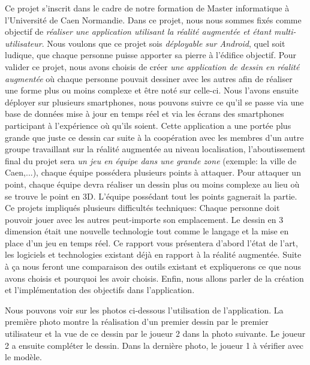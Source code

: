 \documentclass[12pt]{article}
\begin{document}
\medbreak

Ce projet s'inscrit dans le cadre de notre formation de Master informatique à l'Université de Caen Normandie. Dans ce projet, nous nous sommes fixés comme objectif de \textit{réaliser une application utilisant la réalité augmentée et  étant multi-utilisateur}. Nous voulons que ce projet sois \textit{déployable sur Android}, quel soit ludique, que chaque personne puisse apporter sa pierre à l'édifice objectif.
\medbreak
Pour valider ce projet, nous avons choisis de créer \textit{une application de dessin en réalité augmentée} où chaque personne pouvait dessiner avec les autres afin de réaliser une forme plus ou moins complexe et être noté sur celle-ci. Nous l'avons ensuite déployer sur plusieurs smartphones, nous pouvons suivre ce qu'il se passe via une base de données mise à jour en temps réel et via les écrans des smartphones participant à l'expérience où qu'ils soient.
Cette application a une portée plus grande que juste ce dessin car suite à la coopération avec les membres d'un autre groupe travaillant sur la réalité augmentée au niveau localisation, l'aboutissement final du projet sera \textit{un jeu en équipe dans une grande zone} (exemple: la ville de Caen,...), chaque équipe possédera plusieurs points à attaquer. Pour attaquer un point, chaque équipe devra réaliser un dessin plus ou moins complexe au lieu où se trouve le point en 3D. L'équipe possédant tout les points gagnerait la partie.
\medbreak
Ce projets impliqués plusieurs difficultés techniques: Chaque personne doit pouvoir jouer avec les autres peut-importe son emplacement. Le dessin en 3 dimension était une nouvelle technologie tout comme le langage et la mise en place d'un jeu en temps réel. 
\medbreak
Ce rapport vous présentera d'abord l'état de l'art, les logiciels et technologies existant déjà en rapport à la réalité augmentée. Suite à ça nous feront une comparaison des outils existant et expliquerons ce que nous avons choisis et pourquoi les avoir choisis. Enfin, nous allons parler de la création et l'implémentation des objectifs dans l'application.

\medbreak
Nous pouvons voir sur les photos ci-dessous l’utilisation de l’application. La première photo montre la réalisation d’un premier dessin par le premier utilisateur et la vue de ce dessin par le joueur 2 dans la photo suivante. Le joueur 2 a ensuite compléter le dessin. Dans la dernière photo, le joueur 1 à vérifier avec le modèle. 
\end{document}
